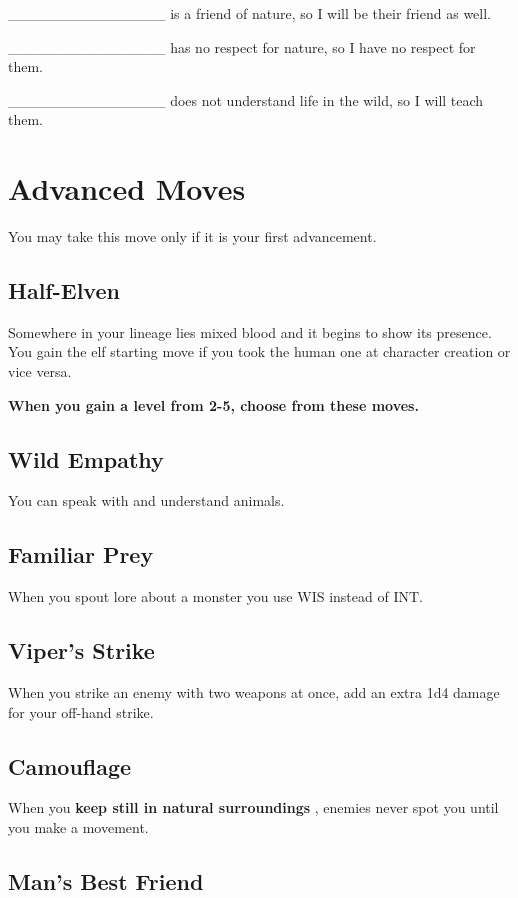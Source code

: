  \_\_\_\_\_\_\_\_\_\_\_\_\_\_\_ is a friend of nature, so I will be their friend as well.


 \_\_\_\_\_\_\_\_\_\_\_\_\_\_\_ has no respect for nature, so I have no respect for them.


 \_\_\_\_\_\_\_\_\_\_\_\_\_\_\_ does not understand life in the wild, so I will teach them.
\section*{Advanced Moves}


 You may take this move only if it is your first advancement.
\subsection{Half-Elven}


 Somewhere in your lineage lies mixed blood and it begins to show its presence. You gain the elf starting move if you took the human one at character creation or vice versa.


\vspace{\baselineskip}
 {\bfseries When you gain a level from 2-5, choose from these moves.}
\subsection{Wild Empathy}


 You can speak with and understand animals.
\subsection{Familiar Prey}


 When you spout lore about a monster you use WIS instead of INT.
\subsection{Viper's Strike}


 When you strike an enemy with two weapons at once, add an extra 1d4 damage for your off-hand strike.
\subsection{Camouflage}


 When you \textbf{keep still in natural surroundings}
, enemies never spot you until you make a movement.
\subsection{Man's Best Friend}


